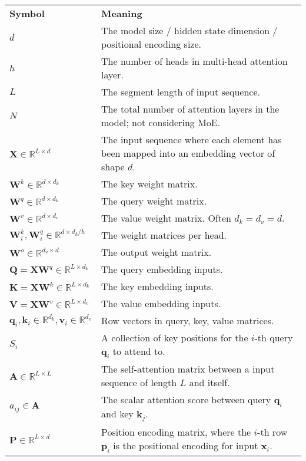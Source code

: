 \documentclass[12pt]{article}
\begin{document}
\begin{table}[h!]
\centering
\begin{tabular}{ll}
\textbf{Symbol} & \textbf{Meaning} \\
$d$ & The model size / hidden state dimension / positional encoding size. \\
$h$ & The number of heads in multi-head attention layer. \\
$L$ & The segment length of input sequence. \\
$N$ & The total number of attention layers in the model; not considering MoE. \\
$\mathbf{X} \in \mathbb{R}^{L \times d}$ & The input sequence where each element has been mapped into an embedding vector of shape $d$. \\
$\mathbf{W}^k \in \mathbb{R}^{d \times d_k}$ & The key weight matrix. \\
$\mathbf{W}^q \in \mathbb{R}^{d \times d_k}$ & The query weight matrix. \\
$\mathbf{W}^v \in \mathbb{R}^{d \times d_v}$ & The value weight matrix. Often $d_k = d_v = d$. \\
$\mathbf{W}^k_i, \mathbf{W}^q_i \in \mathbb{R}^{d \times d_k/h}$ & The weight matrices per head. \\
$\mathbf{W}^o \in \mathbb{R}^{d_v \times d}$ & The output weight matrix. \\
$\mathbf{Q} = \mathbf{X}\mathbf{W}^q \in \mathbb{R}^{L \times d_k}$ & The query embedding inputs. \\
$\mathbf{K} = \mathbf{X}\mathbf{W}^k \in \mathbb{R}^{L \times d_k}$ & The key embedding inputs. \\
$\mathbf{V} = \mathbf{X}\mathbf{W}^v \in \mathbb{R}^{L \times d_v}$ & The value embedding inputs. \\
$\mathbf{q}_i, \mathbf{k}_i \in \mathbb{R}^{d_k}, \mathbf{v}_i \in \mathbb{R}^{d_v}$ & Row vectors in query, key, value matrices. \\
$S_i$ & A collection of key positions for the $i$-th query $\mathbf{q}_i$ to attend to. \\
$\mathbf{A} \in \mathbb{R}^{L \times L}$ & The self-attention matrix between a input sequence of length $L$ and itself. \\
$a_{ij} \in \mathbf{A}$ & The scalar attention score between query $\mathbf{q}_i$ and key $\mathbf{k}_j$. \\
$\mathbf{P} \in \mathbb{R}^{L \times d}$ & Position encoding matrix, where the $i$-th row $\mathbf{p}_i$ is the positional encoding for input $\mathbf{x}_i$. \\
\end{tabular}
\end{table}
\end{document}
